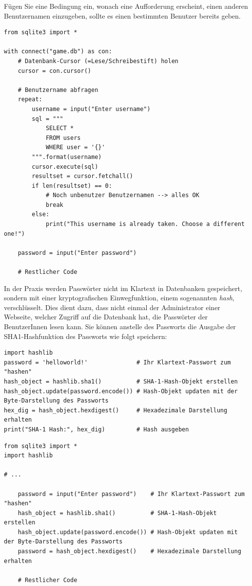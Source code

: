 \begin{mychallenge}
Fügen Sie eine Bedingung ein, wonach eine Aufforderung erscheint, einen anderen Benutzernamen einzugeben, sollte es einen bestimmten Benutzer bereits geben.
\begin{myanswer}
\begin{lstlisting}
from sqlite3 import *

with connect("game.db") as con:
    # Datenbank-Cursor (=Lese/Schreibestift) holen
    cursor = con.cursor()

    # Benutzername abfragen
    repeat:
        username = input("Enter username")
        sql = """
            SELECT * 
            FROM users
            WHERE user = '{}'
        """.format(username)
        cursor.execute(sql)
        resultset = cursor.fetchall()
        if len(resultset) == 0:
            # Noch unbenutzer Benutzernamen --> alles OK
            break
        else:
            print("This username is already taken. Choose a different one!")
    
    password = input("Enter password")

    # Restlicher Code

\end{lstlisting}
\end{myanswer}
\end{mychallenge}

\begin{mychallenge}
In der Praxis werden Passwörter nicht im Klartext in Datenbanken gespeichert, sondern mit einer kryptografischen Einwegfunktion, einem sogenannten \textit{hash}, verschlüsselt. Dies dient dazu, dass nicht einmal der Administrator einer Webseite, welcher Zugriff auf die Datenbank hat, die Passwörter der BenutzerInnen lesen kann. Sie können anstelle des Passworts die Ausgabe der SHA1-Hashfunktion des Passworts wie folgt speichern:
\begin{lstlisting}
import hashlib
password = 'helloworld!'              # Ihr Klartext-Passwort zum "hashen"
hash_object = hashlib.sha1()          # SHA-1-Hash-Objekt erstellen
hash_object.update(password.encode()) # Hash-Objekt updaten mit der Byte-Darstellung des Passworts
hex_dig = hash_object.hexdigest()     # Hexadezimale Darstellung erhalten
print("SHA-1 Hash:", hex_dig)         # Hash ausgeben

\end{lstlisting}
\begin{myanswer}
\begin{lstlisting}
from sqlite3 import *
import hashlib

# ...

    password = input("Enter password")    # Ihr Klartext-Passwort zum "hashen"
    hash_object = hashlib.sha1()          # SHA-1-Hash-Objekt erstellen
    hash_object.update(password.encode()) # Hash-Objekt updaten mit der Byte-Darstellung des Passworts
    password = hash_object.hexdigest()    # Hexadezimale Darstellung erhalten

    # Restlicher Code
\end{lstlisting}
\end{myanswer}
\end{mychallenge}


